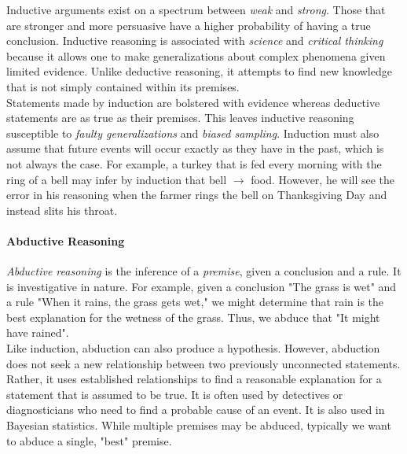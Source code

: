 
Inductive arguments exist on a spectrum between \textit{weak} and \textit{strong}. Those that are stronger and more persuasive have a higher probability of having a true conclusion. Inductive reasoning is associated with \textit{science} and \textit{critical thinking} because it allows one to make generalizations about complex phenomena given limited evidence. Unlike deductive reasoning, it attempts to find new knowledge that is not simply contained within its premises. \\

Statements made by induction are bolstered with evidence whereas deductive statements are as true as their premises. This leaves inductive reasoning susceptible to \textit{faulty generalizations} and \textit{biased sampling}. Induction must also assume that future events will occur exactly as they have in the past, which is not always the case. For example, a turkey that is fed every morning with the ring of a bell may infer by induction that bell $\rightarrow$ food. However, he will see the error in his reasoning when the farmer rings the bell on Thanksgiving Day and instead slits his throat. \\

\paragraph{Abductive Reasoning} \hspace*{1mm} \vspace*{2mm}

\textit{Abductive reasoning} is the inference of a \textit{premise}, given a conclusion and a rule. It is investigative in nature. For example, given a conclusion "The grass is wet" and a rule "When it rains, the grass gets wet," we might determine that rain is the best explanation for the wetness of the grass. Thus, we abduce that "It might have rained". \\

Like induction, abduction can also produce a hypothesis. However, abduction does not seek a new relationship between two previously unconnected statements. Rather, it uses established relationships to find a reasonable explanation for a statement that is assumed to be true. It is often used by detectives or diagnosticians who need to find a probable cause of an event. It is also used in Bayesian statistics. While multiple premises may be abduced, typically we want to abduce a single, "best" premise. \\

